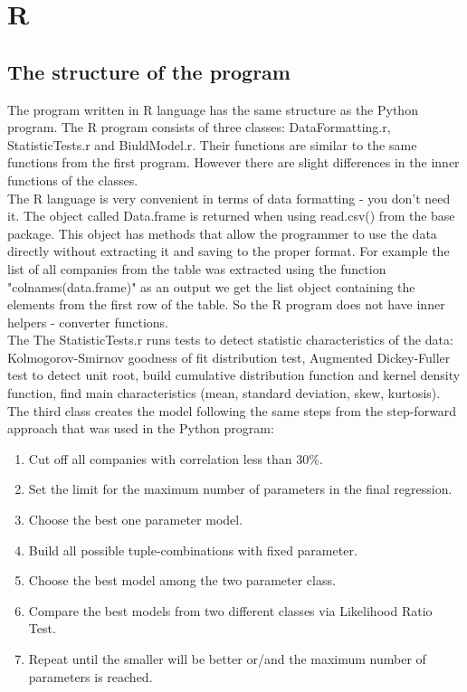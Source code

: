 \documentclass{article}
\begin{document}
\newpage
\section{R}
\subsection{The structure of the program}
The program written in R language has the same structure as the Python program. The R program consists of three classes: DataFormatting.r, StatisticTests.r and BiuldModel.r. Their functions are similar to the same functions from the first program. However there are slight differences in the inner functions of the classes.\\
The R language is very convenient in terms of data formatting - you don't need it. The object called Data.frame is returned when using read.csv() from the base package. This object has methods that allow the programmer to use the data directly without extracting it and saving to the proper format. For example the list of all companies from the table was extracted using the function "colnames(data.frame)" as an output we get the list object containing the elements from the first row of the table. So the R program does not have inner helpers - converter functions.\\
The The StatisticTests.r runs tests to detect statistic characteristics of the data: Kolmogorov-Smirnov goodness of fit distribution test, Augmented Dickey-Fuller test to detect unit root, build cumulative distribution function and kernel density function, find main characteristics (mean, standard deviation, skew, kurtosis).\\
The third class creates the model following the same steps from the step-forward approach that was used in the Python program:
\begin{enumerate}
    \item Cut off all companies with correlation less than 30\%.
    \item Set the limit for the maximum number of parameters in the final regression. 
    \item Choose the best one parameter model.
    \item Build all possible tuple-combinations with fixed parameter.
    \item Choose the best model among the two parameter class.
    \item Compare the best models from two different classes via Likelihood Ratio Test.
    \item Repeat until the smaller will be better or/and the maximum number of parameters is reached.
\end{enumerate}
\end{document}

